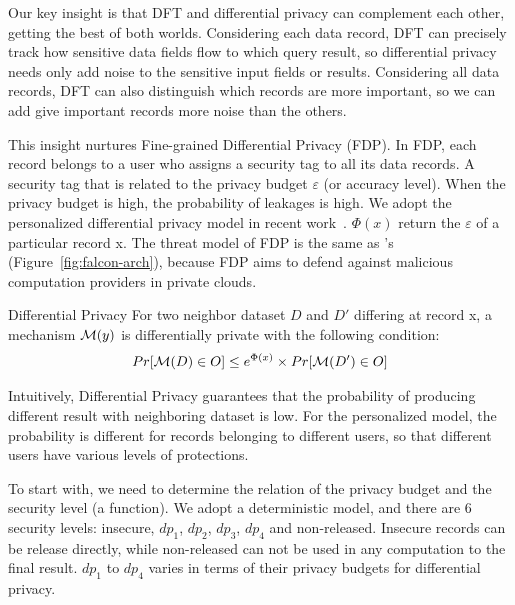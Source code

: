 Our key insight is that DFT and differential privacy can complement each other, 
getting the best of both worlds. Considering each data record, DFT can 
precisely track how sensitive data fields flow to which query result, so 
differential privacy needs only add noise to the sensitive input fields or 
results. Considering all data records, DFT can also distinguish which records 
are more important, so we can add give important records more noise than the 
others.

This insight nurtures Fine-grained Differential Privacy (FDP). In FDP, each 
record belongs to a user who assigns a security tag to all its data records.
A security tag that is related to the privacy budget $\varepsilon$ (or accuracy 
level). When the privacy budget is high, the probability of leakages is high.
We adopt the personalized differential privacy model in recent
work~\cite{pdp:icde15}. $\Phi(x)$ return the $\varepsilon$ of a particular 
record x. The threat model of FDP is the same as \kakute's 
(Figure~\ref{fig:falcon-arch}), because FDP aims to defend against malicious 
computation providers in private clouds. 

\begin{definition}{Differential Privacy}
For two neighbor dataset $D$ and $D'$ differing at record x,
a mechanism ${\cal M}(y)$ is differentially private with the following 
condition:
\begin{align}
Pr[{\cal M}(D) \in O] \leq e^{\Phi(x)} \times Pr[{\cal M}(D') \in O]
\end{align}
\end{definition}

Intuitively, Differential Privacy guarantees that the probability of
producing different result with neighboring dataset is low. For the 
personalized model, the probability is different for records belonging to 
different users, so that different users have various levels of protections.

To start with, we need to determine the relation of the privacy budget and the 
security level (a  function). We adopt a deterministic model, 
and there are 6 security levels: insecure, $dp_1$, $dp_2$, $dp_3$, $dp_4$ and 
non-released. Insecure records can be release directly, while non-released can 
not be used in any computation to the final result. $dp_1$ to $dp_4$ varies in 
terms of their privacy budgets for differential privacy.



